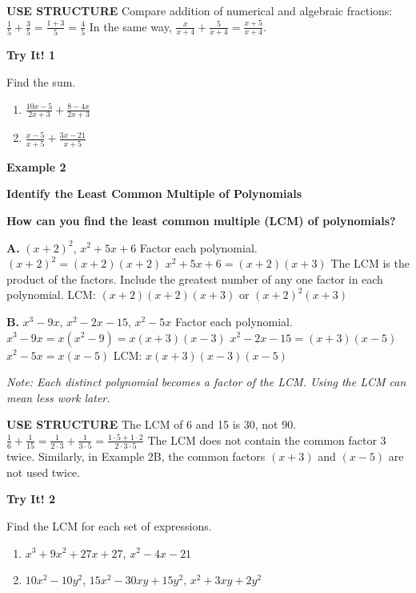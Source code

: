 \documentclass{article}
\newenvironment{concept-box}{}{}
\newenvironment{example}[1]{\textbf{Example #1}\par}{\par}
\newenvironment{tryit}[1]{\textbf{Try It! #1}\par}{\par}
\begin{document}
\begin{concept-box}
\textbf{USE STRUCTURE}
Compare addition of numerical and algebraic fractions:
$\frac{1}{5} + \frac{3}{5} = \frac{1 + 3}{5} = \frac{4}{5}$
In the same way,
$\frac{x}{x + 4} + \frac{5}{x + 4} = \frac{x + 5}{x + 4}$.
\end{concept-box}

\begin{tryit}{1}
Find the sum.
\begin{enumerate}
    \item[\textbf{a.}] $\frac{10x - 5}{2x + 3} + \frac{8 - 4x}{2x + 3}$
    \item[\textbf{b.}] $\frac{x - 5}{x + 5} + \frac{3x - 21}{x + 5}$
\end{enumerate}
\end{tryit}

\begin{example}{2}
\textbf{Identify the Least Common Multiple of Polynomials}

\textbf{How can you find the least common multiple (LCM) of polynomials?}

\textbf{A.} $(x + 2)^2$, $x^2 + 5x + 6$
Factor each polynomial.
$(x + 2)^2 = (x + 2)(x + 2)$
$x^2 + 5x + 6 = (x + 2)(x + 3)$
The LCM is the product of the factors. Include the greatest number of any one factor in each polynomial.
LCM: $(x + 2)(x + 2)(x + 3)$ or $(x + 2)^2(x + 3)$

\textbf{B.} $x^3 - 9x$, $x^2 - 2x - 15$, $x^2 - 5x$
Factor each polynomial.
$x^3 - 9x = x(x^2 - 9) = x(x + 3)(x - 3)$
$x^2 - 2x - 15 = (x + 3)(x - 5)$
$x^2 - 5x = x(x - 5)$
LCM: $x(x + 3)(x - 3)(x - 5)$

\textit{Note: Each distinct polynomial becomes a factor of the LCM. Using the LCM can mean less work later.}
\end{example}

\begin{concept-box}
\textbf{USE STRUCTURE}
The LCM of 6 and 15 is 30, not 90. $\frac{1}{6} + \frac{1}{15} = \frac{1}{2 \cdot 3} + \frac{1}{3 \cdot 5} = \frac{1 \cdot 5 + 1 \cdot 2}{2 \cdot 3 \cdot 5}$
The LCM does not contain the common factor 3 twice. Similarly, in Example 2B, the common factors $(x + 3)$ and $(x - 5)$ are not used twice.
\end{concept-box}

\begin{tryit}{2}
Find the LCM for each set of expressions.
\begin{enumerate}
    \item[\textbf{a.}] $x^3 + 9x^2 + 27x + 27$, $x^2 - 4x - 21$
    \item[\textbf{b.}] $10x^2 - 10y^2$, $15x^2 - 30xy + 15y^2$, $x^2 + 3xy + 2y^2$
\end{enumerate}
\end{tryit}
\end{document}
